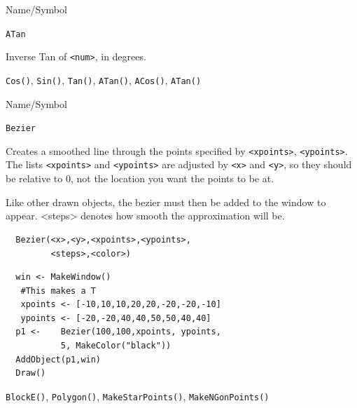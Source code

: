 \begin{desc}{Name/Symbol}

\item[Name/Symbol]  	\verb+ATan+ 

\item[Description]  	Inverse Tan of \verb+<num>+, in degrees.

\item[Usage]		

\item[Example]	

\item[See Also]    	\verb+Cos()+, \verb+Sin()+, \verb+Tan()+, \verb+ATan()+, \verb+ACos()+, \verb+ATan()+ 
\end{desc}

\vfill
\newpage
{} 
\vfill


\begin{desc}{Name/Symbol}
\item[Name/Symbol]  	\verb+Bezier+ 

\item[Description] Creates a smoothed line through the  points
specified by \verb+<xpoints>+, \verb+<ypoints>+. The lists \verb+<xpoints>+ and
\verb+<ypoints>+ are adjusted by  \verb+<x>+ and \verb+<y>+, so they
should be relative to 0, not the location you want the points to be at.

Like other drawn objects, the bezier must then be added to the window
to appear. <steps> denotes how smooth the approximation will be.

\item[Usage]		
\begin{verbatim}
  Bezier(<x>,<y>,<xpoints>,<ypoints>,
         <steps>,<color>)
\end{verbatim}

\item[Example]	
\begin{verbatim}
  win <- MakeWindow()
   #This makes a T
   xpoints <- [-10,10,10,20,20,-20,-20,-10]
   ypoints <- [-20,-20,40,40,50,50,40,40]
  p1 <-    Bezier(100,100,xpoints, ypoints,
           5, MakeColor("black"))
  AddObject(p1,win)
  Draw()
\end{verbatim}

\item[See Also]   
\verb+BlockE()+, \verb+Polygon()+, \verb+MakeStarPoints()+,
\verb+MakeNGonPoints()+
\end{desc}




